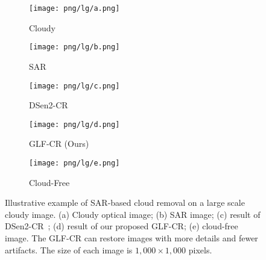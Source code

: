 \documentclass[a4paper,fleqn]{cas-dc}
\begin{document}
\def\sswidth{0.2\textwidth}
\begin{figure*}[!t]
	\centering
	\begin{subfigure}[b]{\sswidth}
		\centering
		\texttt{[image: png/lg/a.png]}
		\caption{Cloudy}
		\label{fig:highlight-Cloudy}
	\end{subfigure}\hspace{-1mm}
	\begin{subfigure}[b]{\sswidth}
		\centering
		\texttt{[image: png/lg/b.png]}
		\caption{SAR}
		\label{fig:highlight-SAR}
	\end{subfigure}\hspace{-1mm}
	\begin{subfigure}[b]{\sswidth}
		\centering
		\texttt{[image: png/lg/c.png]}
		\caption{DSen2-CR}
		\label{fig:highlight-dsen2cr}
	\end{subfigure}\hspace{-1mm}
	\begin{subfigure}[b]{\sswidth}
		\centering
		\texttt{[image: png/lg/d.png]}
		\caption{GLF-CR (Ours)}
		\label{fig:highlight-ours}
	\end{subfigure}\hspace{-1mm}
	\begin{subfigure}[b]{\sswidth}
		\centering
		\texttt{[image: png/lg/e.png]}
		\caption{Cloud-Free}
		\label{fig:highlight-Cloudfree}
	\end{subfigure}
	\caption{Illustrative example of SAR-based cloud removal on a large scale cloudy image. (a) Cloudy optical image; (b) SAR image; (c) result of DSen2-CR~\citep{meraner2020cloud}; (d) result of our proposed GLF-CR; (e) cloud-free image. The GLF-CR can restore images with more details and fewer artifacts. The size of each image is $1,000 \times 1,000$ pixels.}	
	\label{fig:highlight}
	\vspace{-3mm}
\end{figure*}
 
\end{document}

